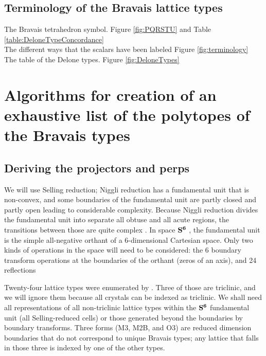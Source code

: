 \documentclass[preprint]{iucr}              %
\begin{document}
\subsection{Terminology of the Bravais lattice types}
The Bravais tetrahedron symbol. Figure \ref{fig:PQRSTU}  and Table \ref{table:DeloneTypeConcordance}\\
The different ways that the scalars have been labeled  Figure \ref{fig:terminology} \\
The table of the Delone types. Figure \ref{fig:DeloneTypes} \\


\section{Algorithms for creation of an exhaustive list of the polytopes of the Bravais types}

\subsection{Deriving the projectors and perps}

We will use Selling reduction; Niggli reduction has a fundamental 
unit that is non-convex, and some boundaries of the fundamental 
unit are partly closed and partly open \cite{andrews2014} leading 
to considerable complexity. Because Niggli reduction divides the 
fundamental unit into separate all obtuse and all acute regions, 
 the transitions between those are quite complex \cite{andrews2014}. 
In space $\bf{S^{6}}$ \cite{andrews2019b}, the fundamental 
unit is the simple all-negative orthant of a 6-dimensional 
Cartesian space. Only two kinds of operations in the space 
will need to be considered: the 6 boundary transform operations 
at the boundaries of the orthant (zeros of an axis), and 
24 reflections \cite{andrews2019}

Twenty-four lattice types were enumerated by . 
Three of those are triclinic, and we will ignore them because all crystals 
can be indexed as triclinic. We 
shall need all representations of all non-triclinic lattice 
types within the $\bf{S^{6}}$ fundamental unit (all Selling-reduced 
cells) or those generated beyond the boundaries by boundary transforms. 
Three forms (M3, M2B, and O3) are reduced dimension boundaries that do
not correspond to unique Bravais types; any lattice that falls in those
three is indexed by one of the other types.
\end{document}
